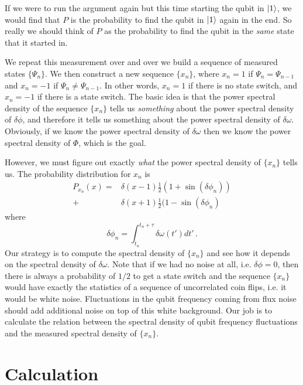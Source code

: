 \documentclass[twocolumn]{article}
\begin{document}
If we were to run the argument again but this time starting the qubit in $| 1 \rangle$, we would find that $P$ is the probability to find the qubit in $| 1 \rangle$ again in the end.
So really we should think of $P$ as the probability to find the qubit in the \emph{same} state that it started in.

We repeat this measurement over and over we build a sequence of measured states $\{ \Psi_n \}$.
We then construct a new sequence $\{ x_n \}$, where $x_n=1$ if $\Psi_n = \Psi_{n-1}$ and $x_n = -1$ if $\Psi_n \neq \Psi_{n-1}$.
In other words, $x_n=1$ if there is no state switch, and $x_n = -1$ if there is a state switch.
The basic idea is that the power spectral density of the sequence $\{ x_n \}$ tells us \emph{something} about the power spectral density of $\delta \phi$, and therefore it tells us something about the power spectral density of $\delta \omega$.
Obviously, if we know the power spectral density of $\delta \omega$ then we know the power spectral density of $\Phi$, which is the goal.

However, we must figure out exactly \emph{what} the power spectral density of $\{ x_n \}$ tells us.
The probability distribution for $x_n$ is
\begin{align}
P_{x_n}(x) = &
\delta (x - 1) \frac{1}{2}( 1 + \sin(\delta \phi_n)) \nonumber \\
+& \delta (x + 1) \frac{1}{2}( 1 - \sin(\delta \phi_n) \label{eq:P_x_n}
\end{align}
where
\begin{equation}
\delta \phi_n = \int_{t_n}^{t_n + \tau} \delta \omega(t') dt' \, .
\end{equation}
Our strategy is to compute the spectral density of $\{ x_n \}$ and see how it depends on the spectral density of $\delta \omega$.
Note that if we had no noise at all, i.e. $\delta \phi = 0$, then there is always a probability of $1/2$ to get a state switch and the sequence $\{ x_n \}$ would have exactly the statistics of a sequence of uncorrelated coin flips, i.e. it would be white noise.
Fluctuations in the qubit frequency coming from flux noise should add additional noise on top of this white background.
Our job is to calculate the relation between the spectral density of qubit frequency fluctuations and the measured spectral density of $\{ x_n \}$.

\section{Calculation}
\end{document}
